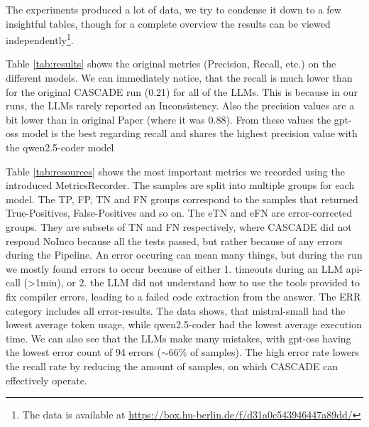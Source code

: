The experiments produced a lot of data, we try to condense it down to a few insightful tables, though for a complete overview the results can be viewed independently\footnote{The data is available at \url{https://box.hu-berlin.de/f/d31a0c543946447a89dd/}}.

Table \ref{tab:results} shows the original metrics (Precision, Recall, etc.) on the different models.
We can immediately notice, that the recall is much lower than for the original CASCADE run (0.21) for all of the LLMs.
This is because in our runs, the LLMs rarely reported an Inconsistency.
Also the precision values are a bit lower than in original Paper (where it was 0.88).
From these values the gpt-oss model is the best regarding recall and shares the highest precision value with the qwen2.5-coder model

Table \ref{tab:resources} shows the most important metrics we recorded using the introduced MetricsRecorder.
The samples are split into multiple groups for each model. 
The TP, FP, TN and FN groups correspond to the samples that returned True-Positives, False-Positives and so on.
The eTN and eFN are error-corrected groups.
They are subsets of TN and FN respectively, where CASCADE did not respond NoInco because all the tests passed, but rather because of any errors during the Pipeline.
An error occuring can mean many things, but during the run we mostly found errors to occur because of either
1. timeouts during an LLM api-call (>1min), or 2. the LLM did not understand how to use the tools provided to fix compiler errors, leading to a failed code extraction from the answer.
The ERR category includes all error-results.
The data shows, that mistral-small had the lowest average token usage, while qwen2.5-coder had the lowest average execution time.
We can also see that the LLMs make many mistakes, with gpt-oss having the lowest error count of 94 errors ($\sim$66\% of samples).
The high error rate lowers the recall rate by reducing the amount of samples, on which CASCADE can effectively operate.

